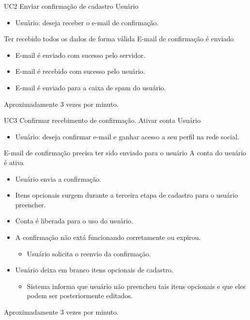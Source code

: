 
\casoDeUso
{UC2}
{Enviar confirmação de cadastro}
{Usuário}
{
\begin{itemize}
	\item Usuário: deseja receber o e-mail de confirmação.
\end{itemize}

}
{Ter recebido todos os dados de forma válida}
{E-mail de confirmação é enviado}
{
\begin{itemize}
	\item E-mail é enviado com sucesso pelo servidor.
	\item E-mail é recebido com sucesso pelo usuário.
	
\end{itemize}
}
{
\begin{itemize}
\item E-mail é enviado para a caixa de spam do usuário.
\end{itemize}
}
{Aproximadamente 3 vezes por  minuto.}
{
 
}


\casoDeUso
{UC3}
{Confirmar recebimento de confirmação. Ativar conta}
{Usuário}
{
\begin{itemize}
	\item Usuário: deseja confirmar e-mail e ganhar acesso a seu perfil na rede social.
\end{itemize}

}
{E-mail de confirmação precisa ter sido enviado para o usuário}
{A conta do usuário é ativa}
{
\begin{itemize}
	\item Usuário envia a confirmação.
	\item Itens opcionais surgem durante a terceira etapa de cadastro para o usuário preencher.		
	\item Conta é liberada para o uso do usuário.		 
\end{itemize}
}
{
\begin{itemize}
	\item A confirmação não extá funcionando corretamente ou expirou.
	\begin{itemize}
		\item Usuário solicita o reenvio da confirmação.
	\end{itemize}
	\item Usuário deixa em branco itens opcionais de cadastro.
	\begin{itemize}
		\item Sistema informa que usuário não preencheu tais itens opcionais e que eles podem ser posteriormente editados.
	\end{itemize}
\end{itemize}
}
{Aproximadamente 3 vezes por minuto.}
{

}

